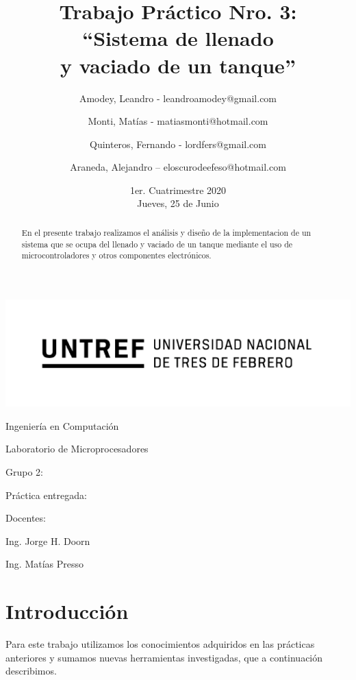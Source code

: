 \documentclass[a4paper]{article}
\title{Trabajo Práctico Nro. 3:\\``Sistema de llenado\\y vaciado de un tanque''}
\author{Amodey, Leandro - leandroamodey@gmail.com
\and Monti, Matías - matiasmonti@hotmail.com
\and Quinteros, Fernando - lordfers@gmail.com
\and Araneda, Alejandro – eloscurodeefeso@hotmail.com}
\date{1er. Cuatrimestre 2020\\Jueves, 25 de Junio}
\def\teacher{Ing. Jorge H. Doorn
\and Ing. Matías Presso}
\begin{document}
\begin{titlepage}\renewcommand\and\par\centering\makeatletter
    \includegraphics{logo.png}\par
    {\Large Ingeniería en Computación \par}\vspace{0.5cm}
    {\LARGE Laboratorio de Microprocesadores \par}\vfill
    {\huge \@title \par}\vfill
    Grupo 2:\par
    \@author\vfill
    Práctica entregada:\par
    \@date\vfill
    Docentes:\par
    \teacher\vspace{1cm}\makeatother
\end{titlepage}

\begin{abstract}

    En el presente trabajo realizamos el análisis y diseño de la
    implementacion de un sistema que se ocupa del llenado y vaciado 
    de un tanque mediante el uso de microcontroladores y otros 
    componentes electrónicos.

\end{abstract}

\section{Introducción}

Para este trabajo utilizamos los conocimientos adquiridos en las 
prácticas anteriores y sumamos nuevas herramientas investigadas, 
que a continuación describimos.


\end{document}
